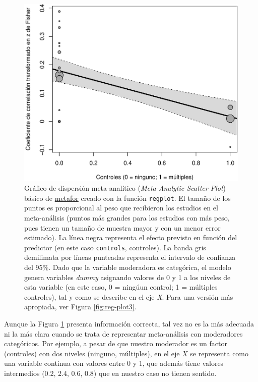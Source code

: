 \documentclass[
  bookmarksnumbered]{article}
\begin{document}
\begin{figure}
\centering
\includegraphics{Meta-analysis_files/figure-latex/reg-plot2-1.pdf}
\caption{\label{fig:reg-plot2}Gráfico de dispersión meta-analítico (\emph{Meta-Analytic Scatter Plot}) básico de \href{https://www.metafor-project.org/doku.php}{metafor} creado con la función \texttt{regplot}. El tamaño de los puntos es proporcional al peso que recibieron los estudios en el meta-análisis (puntos más grandes para los estudios con más peso, pues tienen un tamaño de muestra mayor y con un menor error estimado). La línea negra representa el efecto previsto en función del predictor (en este caso \texttt{controls}, controles). La banda gris demilimata por líneas punteadas representa el intervalo de confianza del 95\%. Dado que la variable moderadora es categórica, el modelo genera variables \emph{dummy} asignando valores de 0 y 1 a los niveles de esta variable (en este caso, 0 = ningúun control; 1 = múltiples controles), tal y como se describe en el eje \emph{X}. Para una versión más apropiada, ver Figura \ref{fig:reg-plot3}.}
\end{figure}

Aunque la Figura \ref{fig:reg-plot2} presenta información correcta, tal vez no es la más adecuada ni la más clara cuando se trata de representar meta-análisis con moderadores categóricos. Por ejemplo, a pesar de que nuestro moderador es un factor (controles) con dos niveles (ninguno, múltiples), en el eje \(X\) se representa como una variable continua con valores entre 0 y 1, que además tiene valores intermedios (0.2, 2.4, 0.6, 0.8) que en nuestro caso no tienen sentido.
\end{document}
